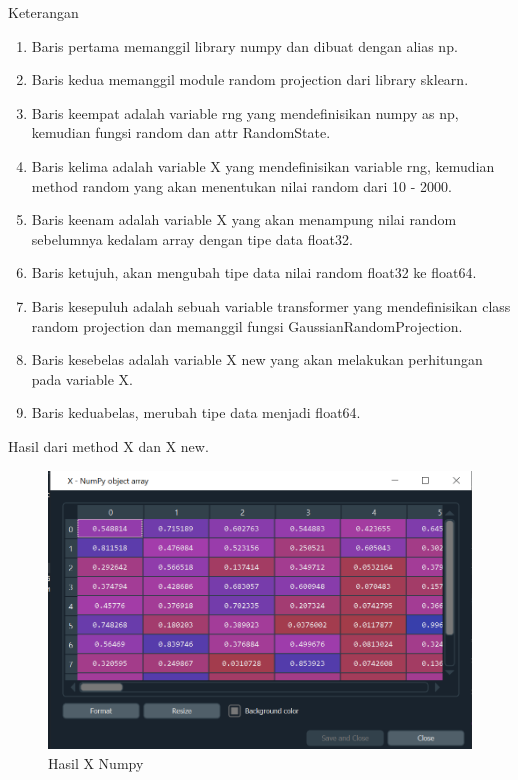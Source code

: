 \par Keterangan
    \begin{enumerate}
        \item Baris pertama memanggil library numpy dan dibuat dengan alias np.
        \item Baris kedua memanggil module random projection dari library sklearn.
        \item Baris keempat adalah variable rng yang mendefinisikan numpy as np, kemudian fungsi random dan attr RandomState.
        \item Baris kelima adalah variable X yang mendefinisikan variable rng, kemudian method random yang akan menentukan nilai random dari 10 - 2000.
        \item Baris keenam adalah variable X yang akan menampung nilai random sebelumnya kedalam array dengan tipe data float32.
        \item Baris ketujuh, akan mengubah tipe data nilai random float32 ke float64.
        \item Baris kesepuluh adalah sebuah variable transformer yang mendefinisikan class random projection dan memanggil fungsi GaussianRandomProjection.
        \item Baris kesebelas adalah variable X new yang akan melakukan perhitungan pada variable X.
        \item Baris keduabelas, merubah tipe data menjadi float64.
    \end{enumerate}

\par Hasil dari method X dan X new.

    \begin{figure}[H]
    \centering
    \includegraphics[width=13cm]{figures/chapter1/17.PNG}
    \caption{Hasil X Numpy}
    \end{figure}
    
